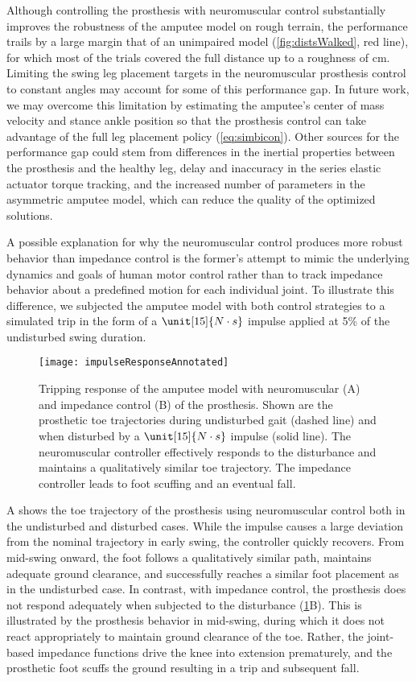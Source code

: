 Although controlling the prosthesis with neuromuscular control substantially
improves the robustness of the amputee model on rough terrain, the performance
trails by a large margin that of an unimpaired model (\cref{fig:distsWalked},
red line), for which most of the trials covered the full distance up to a
roughness of \unit[10]{cm}.  Limiting the swing leg placement targets in the
neuromuscular prosthesis control to constant angles may account for some of this
performance gap. In future work, we may overcome this limitation by estimating
the amputee's center of mass velocity and stance ankle position so that the
prosthesis control can take advantage of the full leg placement policy
(\cref{eq:simbicon}). Other sources for the performance gap could stem from
differences in the inertial properties between the prosthesis and the healthy
leg, delay and inaccuracy in the series elastic actuator torque tracking, and
the increased number of parameters in the asymmetric amputee model, which can
reduce the quality of the optimized solutions.

A possible explanation for why the neuromuscular control produces more robust
behavior than impedance control is the former's attempt to mimic the underlying
dynamics and goals of human motor control rather than to track impedance
behavior about a predefined motion for each individual joint. To illustrate this
difference, we subjected the amputee model with both control strategies to a
simulated trip in the form of a $\unit[15]{N \cdot s}$ impulse applied at 5\% of
the undisturbed swing duration. 

\begin{figure*}[t]
    \centering
    \texttt{[image: impulseResponseAnnotated]}
    \caption[Simulated tripping response of the amputee model with neuromuscular
    and impedance control]{Tripping response of the amputee model with
    neuromuscular (A) and impedance control (B) of the prosthesis. Shown are the
    prosthetic toe trajectories during undisturbed gait (dashed line) and when
    disturbed by a $\unit[15]{N \cdot s}$ impulse (solid line). The
    neuromuscular controller effectively responds to the disturbance and
    maintains a qualitatively similar toe trajectory. The impedance controller
    leads to foot scuffing and an eventual fall.}\label{fig:ImpulseResponses}
\end{figure*}

A shows the toe trajectory of the prosthesis using
neuromuscular control both in the undisturbed and disturbed cases. While the
impulse causes a large deviation from the nominal trajectory in early swing, the
controller quickly recovers. From mid-swing onward, the foot follows a
qualitatively similar path, maintains adequate ground clearance, and
successfully reaches a similar foot placement as in the undisturbed case. In
contrast, with impedance control, the prosthesis does not respond adequately
when subjected to the disturbance (\cref{fig:ImpulseResponses}B). This is
illustrated by the prosthesis behavior in mid-swing, during which it does not
react appropriately to maintain ground clearance of the toe. Rather, the
joint-based impedance functions drive the knee into extension prematurely, and
the prosthetic foot scuffs the ground resulting in a trip and subsequent fall.
